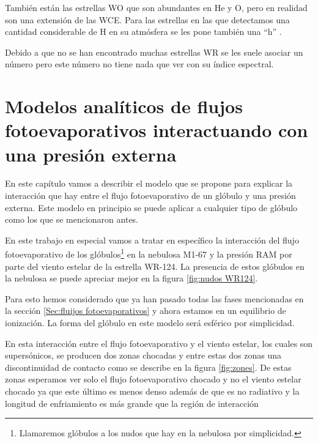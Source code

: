 \documentclass{book}
\begin{document}
También están las estrellas WO que son abundantes en He y O, pero en realidad son una extensión de las WCE. Para las estrellas en las que detectamos una cantidad considerable de H en su atmósfera se les pone también una ``h'' \citep{SSM:1996}.

Debido a que no se han encontrado muchas estrellas WR se les suele asociar un número pero este número no tiene nada que ver con su índice espectral.


\chapter{Modelos analíticos de flujos fotoevaporativos interactuando con una presión externa}
\label{Chapter : Modelo}

En este capítulo vamos a describir el modelo que se propone para explicar la interacción que hay entre el flujo fotoevaporativo de un glóbulo y una presión externa. Este modelo en principio se puede aplicar a cualquier tipo de glóbulo como los que se mencionaron antes. 

En este trabajo en especial vamos a tratar en específico la interacción del flujo fotoevaporativo de los glóbulos\footnote{Llamaremos glóbulos a los nudos que hay en la nebulosa por simplicidad.} en la nebulosa M1-67 y la presión RAM por parte del viento estelar de la estrella WR-124. La presencia de estos glóbulos en la nebulosa se puede apreciar mejor en la figura \ref{fig:nudos WR124}.

Para esto hemos considerado que ya han pasado todas las fases mencionadas en la sección \ref{Sec:fluijos fotoevaporativos} y ahora estamos en un equilibrio de ionización. La forma del glóbulo en este modelo será esférico por simplicidad.

En esta interacción entre el flujo fotoevaporativo y el viento estelar, los cuales son supersónicos, se producen dos zonas chocadas y entre estas dos zonas una discontinuidad de contacto como se describe en la figura \ref{fig:zones}. De estas zonas esperamos ver solo el flujo fotoevaporativo chocado y no el viento estelar chocado ya que este último es menos denso además de que es no radiativo y la longitud de enfriamiento es más grande que la región de interacción
\end{document}
